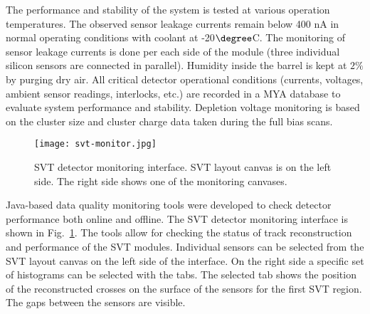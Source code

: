 The performance and stability of the system is tested at various operation temperatures. The observed sensor leakage currents remain below 400 nA in normal operating conditions with coolant at -20$\degree$C. The monitoring of sensor leakage currents is done per each side of the module (three individual silicon sensors are connected in parallel). Humidity inside the barrel is kept at $2\%$ by purging dry air. All critical detector operational conditions (currents, voltages, ambient sensor readings, interlocks, etc.) are recorded in a MYA database \cite{MYA} to evaluate system performance and stability. Depletion voltage monitoring is based on the cluster size and cluster charge data taken during the full bias scans.

\begin{figure}[hbt] 
\centering 
\texttt{[image: svt-monitor.jpg]}
\caption{SVT detector monitoring interface. SVT layout canvas is on the left side. The right side shows one of the monitoring canvases.}
\label{fig:svt-monitor}
\end{figure}

Java-based data quality monitoring tools were developed to check detector performance both online and offline. The SVT detector monitoring interface is shown in Fig.~\ref{fig:svt-monitor}. The tools allow for checking the status of track reconstruction and performance of the SVT modules. Individual sensors can be selected from the SVT layout canvas on the left side of the interface. On the right side a specific set of histograms can be selected with the tabs. The selected tab shows the position of the reconstructed crosses on the surface of the sensors for the first SVT region. The gaps between the sensors are visible.

